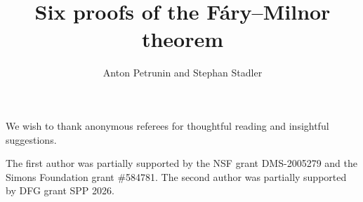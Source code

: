 \documentclass{article}
\begin{document}

\title{%
Six proofs of the Fáry--Milnor theorem}
\author{Anton Petrunin and Stephan Stadler}

\date{}
\maketitle









We wish to thank anonymous referees for thoughtful reading and insightful suggestions.

The first author was partially supported by the NSF grant DMS-2005279 and the Simons Foundation grant \#584781.
The second author was partially supported by DFG grant SPP 2026.

\sloppy
\printbibliography[heading=bibintoc]
\fussy
\end{document}
